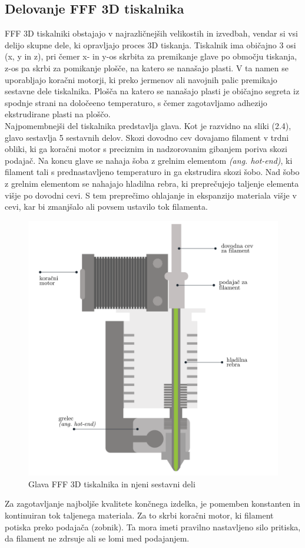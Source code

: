 \documentclass[12pt]{report}
\begin{document}
\subsection{Delovanje \ac{FFF} 3D tiskalnika}
\ac{FFF} 3D tiskalniki obstajajo v najrazličnejših velikostih in izvedbah, vendar si vsi delijo skupne dele, ki opravljajo proces 3D tiskanja. Tiskalnik ima običajno 3 osi (x, y in z), pri čemer x- in y-os skrbita za premikanje glave po
območju tiskanja, z-os pa skrbi za pomikanje plošče, na katero se nanašajo plasti. V ta namen se uporabljajo koračni motorji, ki preko jermenov ali navojnih palic premikajo sestavne dele tiskalnika. Plošča na katero se nanašajo plasti je običajno segreta iz spodnje strani na določeeno temperaturo, s čemer zagotavljamo
adhezijo ekstrudirane plasti na ploščo. \\
Najpomembnejši del tiskalnika predstavlja glava. Kot je razvidno na sliki (2.4), glavo sestavlja 5 sestavnih delov. Skozi dovodno cev dovajamo filament v trdni obliki, ki ga koračni motor s preciznim in nadzorovanim gibanjem poriva skozi podajač. Na koncu glave se nahaja šoba z grelnim elementom \emph{(ang. hot-end)}, ki filament tali s prednastavljeno temperaturo
in ga ekstrudira skozi šobo. Nad šobo z grelnim elementom se nahajajo hladilna rebra, ki preprečujejo taljenje elementa višje po dovodni cevi. S tem preprečimo ohlajanje in ekspanzijo materiala višje v cevi, kar bi zmanjšalo ali povsem ustavilo tok filamenta.
\begin{figure}[H]
  \centering
  \includegraphics[scale=0.5]{Images/extruder.png}
  \caption{Glava FFF 3D tiskalnika in njeni sestavni deli \cite{leapfrog}}
\end{figure}
\noindent Za zagotavljanje najboljše kvalitete končnega izdelka, je pomemben konstanten in kontinuiran tok taljenega materiala. Za to skrbi koračni motor, ki filament potiska preko
podajača (zobnik). Ta mora imeti pravilno nastavljeno silo pritiska, da filament ne zdrsuje ali se lomi med podajanjem. \cite{fff_article}
\end{document}
